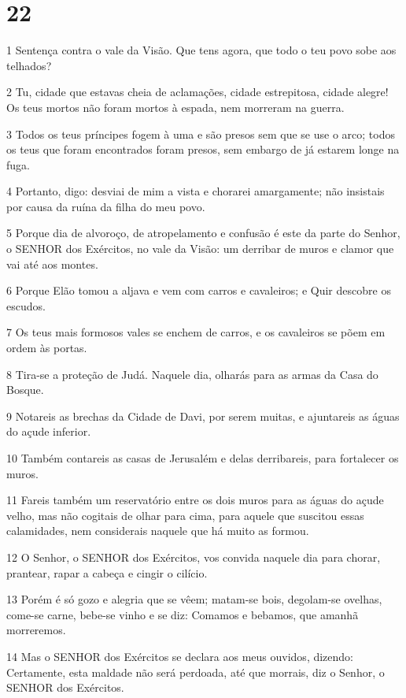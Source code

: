 \chapter{22}

\par 1 Sentença contra o vale da Visão. Que tens agora, que todo o teu povo sobe aos telhados?
\par 2 Tu, cidade que estavas cheia de aclamações, cidade estrepitosa, cidade alegre! Os teus mortos não foram mortos à espada, nem morreram na guerra.
\par 3 Todos os teus príncipes fogem à uma e são presos sem que se use o arco; todos os teus que foram encontrados foram presos, sem embargo de já estarem longe na fuga.
\par 4 Portanto, digo: desviai de mim a vista e chorarei amargamente; não insistais por causa da ruína da filha do meu povo.
\par 5 Porque dia de alvoroço, de atropelamento e confusão é este da parte do Senhor, o SENHOR dos Exércitos, no vale da Visão: um derribar de muros e clamor que vai até aos montes.
\par 6 Porque Elão tomou a aljava e vem com carros e cavaleiros; e Quir descobre os escudos.
\par 7 Os teus mais formosos vales se enchem de carros, e os cavaleiros se põem em ordem às portas.
\par 8 Tira-se a proteção de Judá. Naquele dia, olharás para as armas da Casa do Bosque.
\par 9 Notareis as brechas da Cidade de Davi, por serem muitas, e ajuntareis as águas do açude inferior.
\par 10 Também contareis as casas de Jerusalém e delas derribareis, para fortalecer os muros.
\par 11 Fareis também um reservatório entre os dois muros para as águas do açude velho, mas não cogitais de olhar para cima, para aquele que suscitou essas calamidades, nem considerais naquele que há muito as formou.
\par 12 O Senhor, o SENHOR dos Exércitos, vos convida naquele dia para chorar, prantear, rapar a cabeça e cingir o cilício.
\par 13 Porém é só gozo e alegria que se vêem; matam-se bois, degolam-se ovelhas, come-se carne, bebe-se vinho e se diz: Comamos e bebamos, que amanhã morreremos.
\par 14 Mas o SENHOR dos Exércitos se declara aos meus ouvidos, dizendo: Certamente, esta maldade não será perdoada, até que morrais, diz o Senhor, o SENHOR dos Exércitos.
